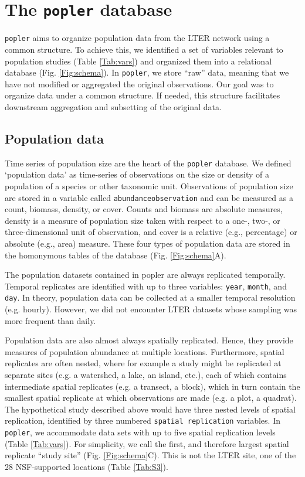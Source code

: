 \documentclass{article}\usepackage[]{graphicx}\usepackage[]{color}
\begin{document}
\section*{The \texttt{popler} database}
\texttt{popler} aims to organize population data from the LTER network using a common structure. To achieve this, we identified a set of variables relevant to population studies (Table \ref{Tab:vars}) and organized them into a relational database (Fig. \ref{Fig:schema}). In \texttt{popler}, we store ``raw'' data, meaning that we have not modified or aggregated the original observations. Our goal was to organize data under a common structure. If needed, this structure facilitates downstream aggregation and subsetting of the original data.

\subsection*{Population data}
Time series of population size are the heart of the \texttt{popler} database. We defined `population data' as time-series of observations on the size or density of a population of a species or other taxonomic unit. Observations of population size are stored in a variable called \texttt{abundance\textunderscore observation} and can be measured as a count, biomass, density, or cover. Counts and biomass are absolute measures, density is a measure of population size taken with respect to a one-, two-, or three-dimensional unit of observation, and cover is a relative (e.g., percentage) or absolute (e.g., area) measure. These four types of population data are stored in the homonymous tables of the database (Fig. \ref{Fig:schema}A).

The population datasets contained in popler are always replicated temporally. Temporal replicates are identified with up to three variables: \texttt{year}, \texttt{month}, and \texttt{day}. In theory, population data can be collected at a smaller temporal resolution (e.g. hourly). However, we did not encounter LTER datasets whose sampling was more frequent than daily. 

Population data are also almost always spatially replicated. Hence, they provide measures of population abundance at multiple locations. Furthermore, spatial replicates are often nested, where for example a study might be replicated at separate sites (e.g. a watershed, a lake, an island, etc.), each of which contains intermediate spatial replicates (e.g. a transect, a block), which in turn contain the smallest spatial replicate at which observations are made (e.g. a plot, a quadrat). The hypothetical study described above would have three nested levels of spatial replication, identified by three numbered \texttt{spatial replication} variables. In \texttt{popler}, we accommodate data sets with up to five spatial replication levels (Table \ref{Tab:vars}). For simplicity, we call the first, and therefore largest spatial replicate ``study site'' (Fig. \ref{Fig:schema}C). This is not the LTER site, one of the 28 NSF-supported locations (Table \ref{Tab:S3}).
\end{document}
